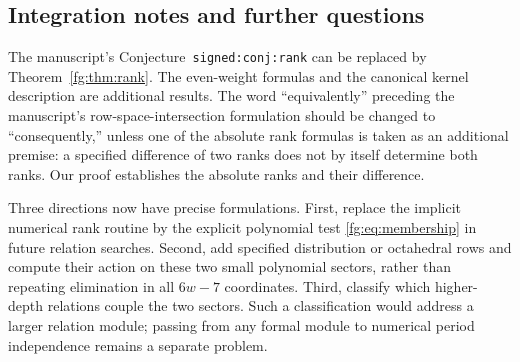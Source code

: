 \subsection{Integration notes and further questions}

The manuscript's Conjecture~\texttt{signed:conj:rank} can be replaced
by Theorem~\ref{fg:thm:rank}. The even-weight formulas and the
canonical kernel description are additional results. The word
``equivalently'' preceding the manuscript's row-space-intersection
formulation should be changed to ``consequently,'' unless one of
the absolute rank formulas is taken as an additional premise: a
specified difference of two ranks does not by itself determine both
ranks. Our proof establishes the absolute ranks and their difference.

Three directions now have precise formulations. First, replace the
implicit numerical rank routine by the explicit polynomial test
\eqref{fg:eq:membership} in future relation searches. Second, add
specified distribution or octahedral rows and compute their action
on these two small polynomial sectors, rather than repeating
elimination in all $6w-7$ coordinates. Third, classify which
higher-depth relations couple the two sectors. Such a classification
would address a larger relation module; passing from any formal
module to numerical period independence remains a separate problem.
